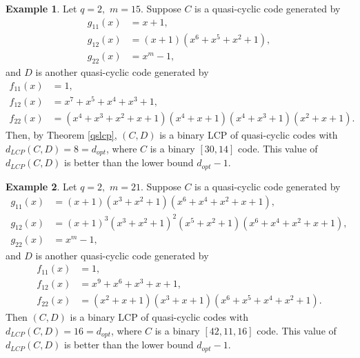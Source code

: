 \documentclass[12 pt]{extarticle}
\numberwithin{equation}{section}
\theoremstyle{definition}
\newtheorem{example}{Example}[section]
\begin{document}
\begin{example}
	Let $q=2,$ $m=15$. Suppose $C$ is a quasi-cyclic code generated by 
	\begin{equation*}
		\begin{split}
			g_{11}(x)&=x+1,\\ 
			g_{12}(x)&=(x+1)(x^6+x^5+x^2+1),\\
			g_{22}(x)&=x^m-1,
		\end{split}
	\end{equation*}
	and $D$ is another quasi-cyclic code generated by 
	\begin{equation*}
		\begin{split}
			f_{11}(x)&= 1,\\ 
			f_{12}(x)&=x^7+x^5+x^4+x^3+1,\\
			f_{22}(x)&=(x^4 + x^3 + x^2 + x + 1)(x^4 + x + 1)(x^4 + x^3 + 1)(x^2 + x + 1).
		\end{split}
	\end{equation*}
	Then, by Theorem \ref{qslcp}, $(C,D)$ is a binary LCP of quasi-cyclic codes with $d_{LCP}(C,D)=8=d_{opt}$, where $C$ is a binary $[30,14]$ code. This value of $d_{LCP}(C,D)$ is better than the lower bound $d_{opt}-1$. 
\end{example}


\begin{example}
	Let $q=2,$ $m=21$. Suppose $C$ is a quasi-cyclic code generated by 
	\begin{equation*}
		\begin{split}
			g_{11}(x)&=(x+1)(x^3 + x^2 + 1)(x^6 + x^4 + x^2 + x + 1),\\ 
			g_{12}(x)&= (x + 1)^3(x^3 + x^2 + 1)^2(x^5 + x^2 + 1)(x^6 + x^4 + x^2 + x + 1),\\
			g_{22}(x)&=x^m-1,
		\end{split}
	\end{equation*}
and $D$ is another quasi-cyclic code generated by 
	\begin{equation*}
		\begin{split}
			f_{11}(x)&= 1,\\ 
			f_{12}(x)&= x^9 + x^6 + x^3 + x + 1,\\
			f_{22}(x)&= (x^2 + x + 1)(x^3 + x + 1)(x^6 + x^5 + x^4 + x^2 + 1).
		\end{split}
	\end{equation*}
	Then $(C,D)$ is a binary LCP of quasi-cyclic codes with $d_{LCP}(C,D)=16=d_{opt}$, where $C$ is a binary $[42,11,16]$ code. This value of $d_{LCP}(C,D)$ is better than the lower bound $d_{opt}-1$. 
\end{example}
\end{document}
